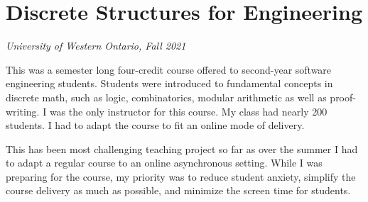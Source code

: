 \documentclass[
]{report}
\begin{document}
\hypertarget{discrete-structures-for-engineering}{%
\section{Discrete Structures for Engineering}\label{discrete-structures-for-engineering}}

\emph{University of Western Ontario, Fall 2021}

This was a semester long four-credit course offered to second-year software engineering students. Students were introduced to fundamental concepts in discrete math, such as logic, combinatorics, modular arithmetic as well as proof-writing. I was the only instructor for this course. My class had nearly 200 students. I had to adapt the course to fit an online mode of delivery.

This has been most challenging teaching project so far as over the summer I had to adapt a regular course to an online asynchronous setting. While I was preparing for the course, my priority was to reduce student anxiety, simplify the course delivery as much as possible, and minimize the screen time for students.
\end{document}
